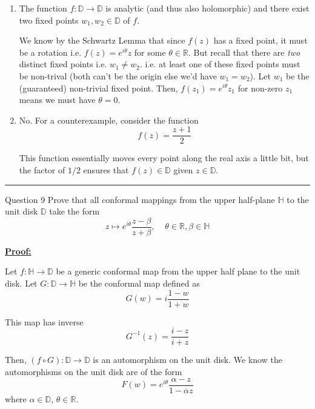 \documentclass{article}
\newcommand{\R}{\mathbb{R}}
\begin{document}
\begin{enumerate}[label=(\alph*)]
  \item The function $f : \mathbb{D} \rightarrow \mathbb{D}$ is analytic (and thus also holomorphic) and there exist two fixed points $w_1, w_2 \in \mathbb{D}$ of $f$. 
  
  We know by the Schwartz Lemma that since $f(z)$ has a fixed point, it must be a rotation i.e. $f(z) = e^{i\theta} z$ for some $\theta \in \R$. But recall that there are \emph{two} distinct fixed points i.e. $w_1 \neq w_2$. i.e. at least one of these fixed points must be non-trival (both can't be the origin else we'd have $w_1 = w_2$). Let $w_1$ be the (guaranteed) non-trivial fixed point. Then, $f(z_1) = e^{i\theta} z_1$ for non-zero $z_1$ means we must have $\theta = 0$.

  \vskip 0.5cm
  \item No. For a counterexample, consider the function 
  \[ f(z) = \frac{z+1}{2} \] 

  This function essentially moves every point along the real axis a little bit, but the factor of $1/2$ ensures that $f(z) \in \mathbb{D}$ given $z \in \mathbb{D}$.
\end{enumerate}

\vskip 0.5cm
\hrule 
\vskip 0.5cm



\begin{mathdefinitionbox}{Question 9}
\vskip 0.5cm
Prove that all conformal mappings from the upper half-plane $\mathbb{H}$ to the unit disk $\mathbb{D}$ take the form \[ z \mapsto e^{i\theta} \frac{z - \beta}{z + \beta}, \;\;\;\; \theta \in \R, \beta \in \mathbb{H} \] 
\end{mathdefinitionbox}

\vskip 0.5cm
\underline{\textbf{Proof:}}

Let $f : \mathbb{H} \rightarrow \mathbb{D}$ be a generic conformal map from the upper half plane to the unit disk. Let $G : \mathbb{D} \rightarrow \mathbb{H}$ be the conformal map defined as \[ G(w) = i\frac{1-w}{1+w} \]

This map has inverse \[ G^{-1}(z) = \frac{i-z}{i+z} \]


Then, $\left(f \circ G\right) : \mathbb{D} \rightarrow \mathbb{D}$ is an automorphism on the unit disk. We know the automorphisms on the unit disk are of the form 
\[ F(w) = e^{i\theta}  \frac{\alpha - z}{1 - \overline{\alpha} z} \] where $\alpha \in \mathbb{D}$, $\theta \in \R$. 
\end{document}
